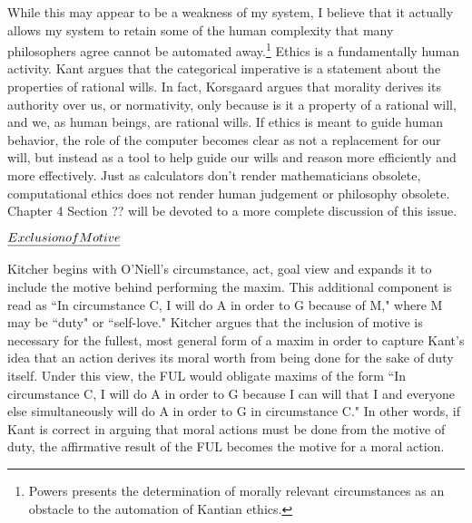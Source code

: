 \begin{isabellebody}
\begin{isamarkuptext}
While this may appear to be a weakness of my system, I believe that it actually
allows my system to retain some of the human complexity that many philosophers agree cannot be automated away.\footnote{Powers \cite{powers} presents 
the determination of morally relevant circumstances as an obstacle to the automation of Kantian ethics.}
Ethics is a fundamentally human activity. Kant argues that the categorical imperative is a statement 
about the properties of rational wills. In fact, Korsgaard argues that morality derives its authority over us, 
or normativity, only because is it a property of a rational will, and we, as human beings, are rational wills.
If ethics is meant to guide human behavior, the role of the computer becomes clear as not a replacement for our will,
but instead as a tool to help guide our wills and reason more efficiently 
and more effectively. Just as calculators don't render mathematicians obsolete, computational ethics
does not render human judgement or philosophy obsolete. Chapter 4 Section ?? will be devoted to a more complete discussion 
of this issue.

$\emph{Exclusion of Motive}$

Kitcher \cite{whatisamaxim} begins with O'Niell's circumstance, act, goal view and expands it to include the motive 
behind performing the maxim. This additional component is read 
as ``In circumstance C, I will do A in order to G because of M," where M may be ``duty" or ``self-love."
Kitcher argues that the inclusion of motive is necessary for the fullest, most general form of a maxim
in order to capture Kant's idea that an action derives its moral worth from being done for the sake of duty itself.
Under this view, the FUL would obligate maxims of the form 
``In circumstance C, I will do A in order to G because I can will that I and everyone else simultaneously
will do A in order to G in circumstance C." In other words, if Kant is correct in arguing that moral 
actions must be done from the motive of duty, the affirmative result of the FUL becomes 
the motive for a moral action.


\end{isamarkuptext}
\end{isabellebody}
